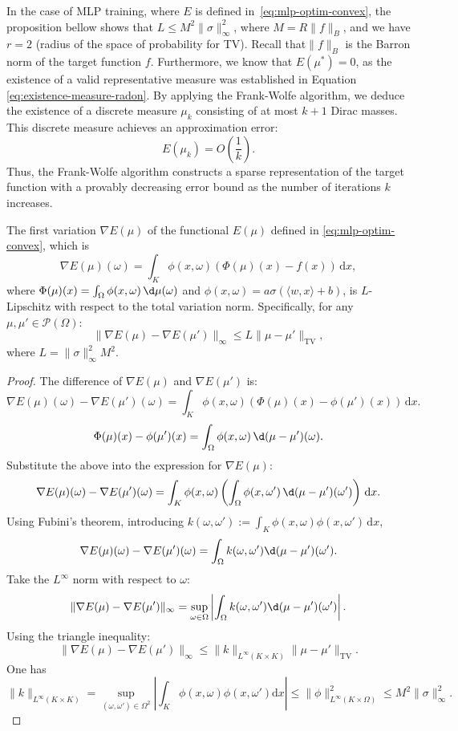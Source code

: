 In the case of MLP training, where $E$ is defined in~\eqref{eq:mlp-optim-convex}, the proposition bellow shows that $L \leq M^2 \|\sigma\|_\infty^2$, where $M = R \|f\|_B$, and we have $r=2$ (radius of the space of probability for TV). Recall that$\|f\|_B$ is the Barron norm of the target function $f$. 
%
Furthermore, we know that $E(\mu^*) = 0$, as the existence of a valid representative measure was established in Equation \eqref{eq:existence-measure-radon}. 
%
By applying the Frank-Wolfe algorithm, we deduce the existence of a discrete measure $\mu_k$ consisting of at most $k+1$ Dirac masses. This discrete measure achieves an approximation error:
\[
E(\mu_k) = O\left(\frac{1}{k}\right).
\]
Thus, the Frank-Wolfe algorithm constructs a sparse representation of the target function with a provably decreasing error bound as the number of iterations $k$ increases.

\begin{prop}
The first variation \(\nabla E(\mu)\) of the functional \(E(\mu)\) defined in \eqref{eq:mlp-optim-convex}, which is 
\[
	\nabla E(\mu)(\omega) = \int_K \phi(x, \omega) \left( \Phi(\mu)(x) - f(x) \right) \, \mathrm{d}x,
\]
where \(\Phi(\mu)(x) = \int_\Omega \phi(x, \omega) \, \d\mu(\omega)\) and \(\phi(x, \omega) = a \sigma(\langle w, x \rangle + b)\), is \(L\)-Lipschitz with respect to the total variation norm. Specifically, for any \(\mu, \mu' \in \mathcal{P}(\Omega)\):
\[
	\|\nabla E(\mu) - \nabla E(\mu')\|_\infty \leq L \|\mu - \mu'\|_{\text{TV}},
\]
where \(L = \|\sigma\|_\infty^2 M^2\).
\end{prop}

\begin{proof}
The difference of \(\nabla E(\mu)\) and \(\nabla E(\mu')\) is:
\[
\nabla E(\mu)(\omega) - \nabla E(\mu')(\omega) = \int_K \phi(x, \omega) \left( \Phi(\mu)(x) - \phi(\mu')(x) \right) \, \mathrm{d}x.
\]
\[
\Phi(\mu)(x) - \phi(\mu')(x) = \int_\Omega \phi(x, \omega) \, \d(\mu - \mu')(\omega).
\]
Substitute the above into the expression for \(\nabla E(\mu)\):
\[
\nabla E(\mu)(\omega) - \nabla E(\mu')(\omega) = \int_K \phi(x, \omega) \left( \int_\Omega \phi(x, \omega') \, \d(\mu - \mu')(\omega') \right) \, \mathrm{d}x.
\]
Using Fubini's theorem, introducing $k(\omega,\omega') := \int_K \phi(x, \omega) \phi(x, \omega') \, \mathrm{d}x$, 
\[
\nabla E(\mu)(\omega) - \nabla E(\mu')(\omega) = \int_\Omega k(\omega,\omega') \d(\mu - \mu')(\omega').
\]
Take the \(L^\infty\) norm with respect to \(\omega\):
\[
\|\nabla E(\mu) - \nabla E(\mu')\|_\infty = \sup_{\omega \in \Omega} \left| \int_\Omega k(\omega,\omega') \d(\mu - \mu')(\omega') \right|.
\]
Using the triangle inequality:
\[
\|\nabla E(\mu) - \nabla E(\mu')\|_\infty \leq \|k\|_{L^\infty(K \times K)} \|\mu - \mu'\|_{\mathrm{TV}}.
\]
One has 
$$
	\|k\|_{L^\infty(K \times K)} = \sup_{(\omega,\omega') \in \Omega^2} |\int_K \phi(x, \omega) \phi(x, \omega')  \mathrm{d}x|
	\leq \|\phi\|^2_{L^\infty(K \times \Omega)} \leq M^2 \|\sigma\|_\infty^2. 
$$
\end{proof}
